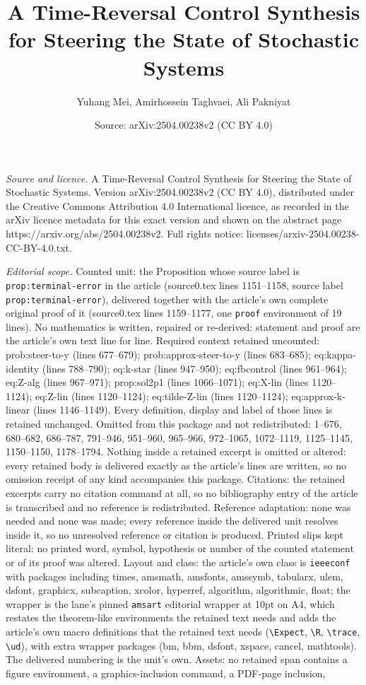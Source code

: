 \documentclass[10pt,a4paper]{amsart}
\title[A Time-Reversal Control Synthesis for Steering the State of ]{A Time-Reversal Control Synthesis for Steering the State of Stochastic Systems}
\author{Yuhang Mei, Amirhossein Taghvaei, Ali Pakniyat}
\date{Source: arXiv:2504.00238v2 (CC BY 4.0)}
\begin{document}
\maketitle

\noindent\emph{Source and licence.} A Time-Reversal Control Synthesis for Steering the State of Stochastic Systems. Version arXiv:2504.00238v2 (CC BY 4.0), distributed under the Creative Commons Attribution 4.0 International licence, as recorded in the arXiv licence metadata for this exact version and shown on the abstract page https://arxiv.org/abs/2504.00238v2. Full rights notice: licenses/arxiv-2504.00238-CC-BY-4.0.txt.\par\smallskip

\noindent\textit{Editorial scope.} Counted unit: the Proposition whose source label is \texttt{prop:terminal-error} in the article (source0.tex lines 1151--1158, source label \texttt{prop:terminal-error}), delivered together with the article's own complete original proof of it (source0.tex lines 1159--1177, one \texttt{proof} environment of 19 lines). No mathematics is written, repaired or re-derived: statement and proof are the article's own text line for line. Required context retained uncounted: prob:steer-to-y (lines 677--679); prob:approx-steer-to-y (lines 683--685); eq:kappa-identity (lines 788--790); eq:k-star (lines 947--950); eq:fbcontrol (lines 961--964); eq:Z-alg (lines 967--971); prop:sol2p1 (lines 1066--1071); eq:X-lin (lines 1120--1124); eq:Z-lin (lines 1120--1124); eq:tilde-Z-lin (lines 1120--1124); eq:approx-k-linear (lines 1146--1149). Every definition, display and label of those lines is retained unchanged. Omitted from this package and not redistributed: 1--676, 680--682, 686--787, 791--946, 951--960, 965--966, 972--1065, 1072--1119, 1125--1145, 1150--1150, 1178--1794. Nothing inside a retained excerpt is omitted or altered: every retained body is delivered exactly as the article's lines are written, so no omission receipt of any kind accompanies this package. Citations: the retained excerpts carry no citation command at all, so no bibliography entry of the article is transcribed and no reference is redistributed. Reference adaptation: none was needed and none was made; every reference inside the delivered unit resolves inside it, so no unresolved reference or citation is produced. Printed slips kept literal: no printed word, symbol, hypothesis or number of the counted statement or of its proof was altered. Layout and class: the article's own class is \texttt{ieeeconf} with packages including times, amsmath, amsfonts, amssymb, tabularx, ulem, dsfont, graphicx, subcaption, xcolor, hyperref, algorithm, algorithmic, float; the wrapper is the lane's pinned \texttt{amsart} editorial wrapper at 10pt on A4, which restates the theorem-like environments the retained text needs and adds the article's own macro definitions that the retained text needs (\texttt{\textbackslash Expect}, \texttt{\textbackslash R}, \texttt{\textbackslash trace}, \texttt{\textbackslash ud}), with extra wrapper packages (bm, bbm, dsfont, xspace, cancel, mathtools). The delivered numbering is the unit's own. Assets: no retained span contains a figure environment, a graphics-inclusion command, a PDF-page inclusion, 
\end{document}
